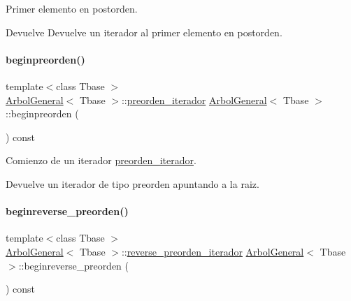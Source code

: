 Primer elemento en postorden. 

\begin{DoxyReturn}{Devuelve}
Devuelve un iterador al primer elemento en postorden. 
\end{DoxyReturn}
\hypertarget{classArbolGeneral_a7ddb1b199b106d0bff369019ec792bba}{}\label{classArbolGeneral_a7ddb1b199b106d0bff369019ec792bba} 
\paragraph{\texorpdfstring{beginpreorden()}{beginpreorden()}}
{\footnotesize\ttfamily template$<$class Tbase $>$ \\
\hyperlink{classArbolGeneral}{Arbol\+General}$<$ Tbase $>$\+::\hyperlink{classArbolGeneral_1_1preorden__iterador}{preorden\+\_\+iterador} \hyperlink{classArbolGeneral}{Arbol\+General}$<$ Tbase $>$\+::beginpreorden (\begin{DoxyParamCaption}{ }\end{DoxyParamCaption}) const}



Comienzo de un iterador \hyperlink{classArbolGeneral_1_1preorden__iterador}{preorden\+\_\+iterador}. 

\begin{DoxyReturn}{Devuelve}
un iterador de tipo preorden apuntando a la raiz. 
\end{DoxyReturn}
\hypertarget{classArbolGeneral_a93ed98e3c548151103e05b693444d3c3}{}\label{classArbolGeneral_a93ed98e3c548151103e05b693444d3c3} 
\paragraph{\texorpdfstring{beginreverse\+\_\+preorden()}{beginreverse\_preorden()}}
{\footnotesize\ttfamily template$<$class Tbase $>$ \\
\hyperlink{classArbolGeneral}{Arbol\+General}$<$ Tbase $>$\+::\hyperlink{classArbolGeneral_1_1reverse__preorden__iterador}{reverse\+\_\+preorden\+\_\+iterador} \hyperlink{classArbolGeneral}{Arbol\+General}$<$ Tbase $>$\+::beginreverse\+\_\+preorden (\begin{DoxyParamCaption}{ }\end{DoxyParamCaption}) const}



